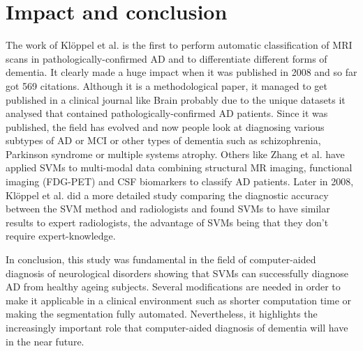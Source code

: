 \documentclass[11pt,a4paper,oneside]{report}
\begin{document}
\section*{Impact and conclusion}

The work of Kl\"{o}ppel et al.\cite{kloppel2008automatic} is the first to perform automatic classification of MRI scans in pathologically-confirmed AD and to differentiate different forms of dementia. It clearly made a huge impact when it was published in 2008 and so far got 569 citations. Although it is a methodological paper, it managed to get published in a clinical journal like Brain probably due to the unique datasets it analysed that contained pathologically-confirmed AD patients. Since it was published, the field has evolved and now people look at diagnosing various subtypes of AD or MCI\cite{haller2013individual} or other types of dementia such as schizophrenia\cite{ardekani2011diffusion}, Parkinson syndrome\cite{focke2011individual} or multiple systems atrophy.\cite{focke2011individual} Others like Zhang et al.\cite{zhang2011multimodal} have applied SVMs to multi-modal data combining structural MR imaging, functional imaging (FDG-PET) and CSF biomarkers to classify AD patients. Later in 2008, Kl\"{o}ppel et al.\cite{kloppel2008accuracy} did a more detailed study comparing the diagnostic accuracy between the SVM method and radiologists and found SVMs to have similar results to expert radiologists, the advantage of SVMs being that they don't require expert-knowledge.

In conclusion, this study was fundamental in the field of computer-aided diagnosis of neurological disorders showing that SVMs can successfully diagnose AD from healthy ageing subjects. Several modifications are needed in order to make it applicable in a clinical environment such as shorter computation time or making the segmentation fully automated. Nevertheless, it highlights the increasingly important role that computer-aided diagnosis of dementia will have in the near future.


\nocite{*} %


\end{document}
